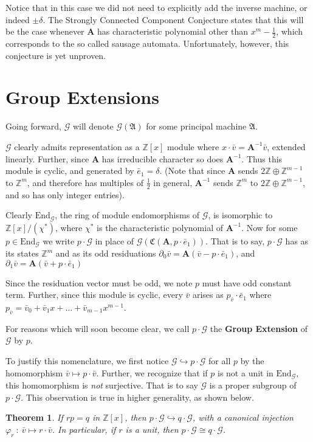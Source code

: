 \documentclass[runningheads]{llncs}
\newcommand{\G}{\mathcal{G}}
\renewcommand{\P}{\mathfrak{A}}
\newcommand{\Z}{\mathbb{Z}}
\newcommand{\2}{\textbf{2}}
\newcommand{\Am}{\textbf{A}}
\newcommand{\del}{\partial}
\renewcommand{\v}{\bar{v}}
\newcommand{\e}{\bar{e}}
\newtheorem{thm}{Theorem}
\begin{document}
Notice that in this case we did not need to explicitly add the 
inverse machine, or indeed $\pm \delta$. The Strongly Connected Component
Conjecture states that this will be the case whenever $\Am$ has 
characteristic polynomial other than $x^m - \frac{1}{2}$, which corresponds
to the so called sausage automata. Unfortunately, however, 
this conjecture is yet unproven.

\section{Group Extensions}
Going forward, $\G$ will denote $\G(\P)$ for some principal machine $\P$.

$\G$ clearly admits representation as a $\Z[x]$ module where 
$x \cdot \v = \Am^{-1}\v$, extended linearly. Further, since $\Am$ has 
irreducible character so does $\Am^{-1}$. Thus this module is cyclic, 
and generated by $\e_1 = \delta$. 
(Note that since $\Am$ sends $2\Z \oplus \Z^{m-1}$ to $\Z^m$, and therefore
has multiples of $\frac{1}{2}$ in general, $\Am^{-1}$ sends $\Z^m$ to 
$2\Z \oplus \Z^{m-1}$, and so has only integer entries).

Clearly $\text{End}_{\G}$, the ring of module endomorphisms of $\G$, 
is isomorphic to $\Z[x]/(\chi^*)$, 
where $\chi^*$ is the characteristic polynomial of $\Am^{-1}$.
Now for some $p \in \text{End}_{\G}$ we write
$p \cdot \G$ in place of $\G(\mathfrak{C}(\Am,p \cdot \e_1))$.
That is to say, $p \cdot \G$ has as its states $\Z^m$ and as its 
odd residuations
$\del_0 \v = \Am (\v - p \cdot \e_1)$, and 
$\del_1 \v = \Am (\v + p \cdot \e_1)$

Since the residuation vector must be odd, we note $p$ must have odd
constant term. Further, since this module is cyclic, every $\v$ arises as 
$p_{\v} \cdot \e_1$ where $p_{\v} = \v_0 + \v_1 x + \ldots + \v_{m-1} x^{m-1}$.

For reasons which will soon become clear, we call $p \cdot \G$ the
\textbf{Group Extension} of $\G$ by $p$.

To justify this nomenclature, we first notice 
$\G \hookrightarrow p \cdot \G$ for all $p$ by the
homomorphism $\v \mapsto p \cdot \v$. 
Further, we recognize that if $p$ is not a unit in $\text{End}_{\G}$, 
this homomorphism is \emph{not} surjective. 
That is to say $\G$ is a proper subgroup of $p \cdot \G$.
This observation is true in higher generality, as shown below.

\begin{thm}
  If $rp = q$ in $\Z[x]$, then $p \cdot \G \hookrightarrow q \cdot \G$, 
  with a canonical injection $\varphi_r~:~\v \mapsto r \cdot \v$. 
  In particular, if $r$ is a unit, then $p \cdot \G \cong q \cdot \G$.
\end{thm}
\end{document}
